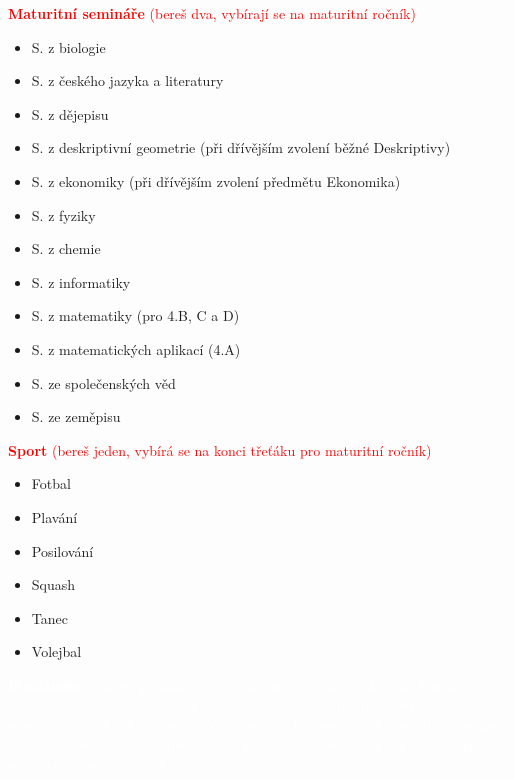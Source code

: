 \documentclass{article}
\begin{document}
\begin{multicols}{2}
  \vfill\null

  \columnbreak

  \noindent \textcolor{red}{\textbf{Maturitní semináře} (bereš dva, vybírají se na maturitní ročník)}
  \begin{itemize}
    \item S. z biologie
    \item S. z českého jazyka a literatury
    \item S. z dějepisu
    \item S. z deskriptivní geometrie (při
    dřívějším zvolení běžné Deskriptivy)
    \item S. z ekonomiky (při dřívějším zvolení předmětu Ekonomika)
    \item S. z fyziky
    \item S. z chemie
    \item S. z informatiky
    \item S. z matematiky (pro 4.B, C a D)
    \item S. z matematických aplikací (4.A)
    \item S. ze společenských věd
    \item S. ze zeměpisu
  \end{itemize}

  \noindent \textcolor{red}{\textbf{Sport} (bereš jeden, vybírá se na konci třeťáku pro maturitní ročník)}
  \begin{itemize}
    \item Fotbal
    \item Plavání
    \item Posilování
    \item Squash
    \item Tanec
    \item Volejbal
  \end{itemize}

  \begin{tcolorbox}[colback=red,boxrule=0pt, sharp corners]
    \textcolor{white}{\footnotesize \textbf{Poznámka.}
     Některé předměty jsou označeny pro třídy X.A apod. Osnovy matematické a všeobecné třídy se trochu liší, a proto jim musí být
      uzpůsoben i repertoár volitelných předmětů.
      Výčet nemusí být kompletní:
      neustále se snažíme vymýšlet nové smysluplné
      předměty -- hlavně do čtvrťáku. A některé ze
      seznamu se vůbec nemusejí otevřít.}

      \hfill
\end{tcolorbox}
\end{multicols}
\end{document}
